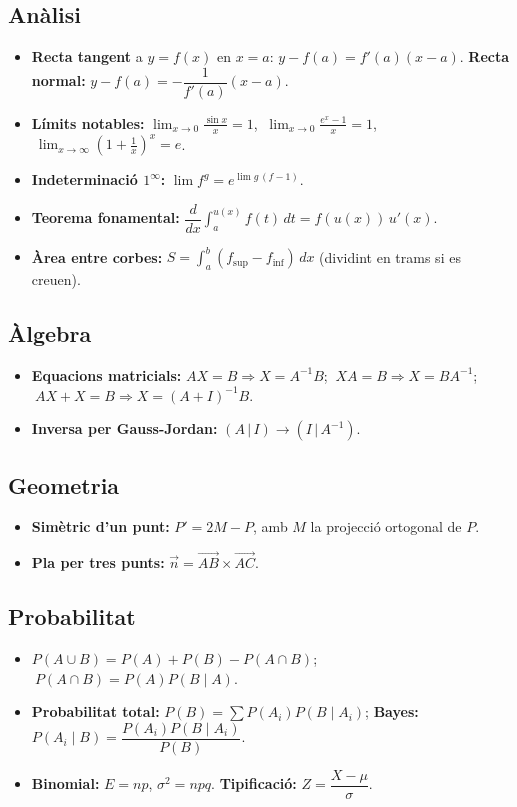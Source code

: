 \subsection*{Anàlisi}

\begin{itemize}
\item \textbf{Recta tangent} a $y=f(x)$ en $x=a$: $y-f(a)=f'(a)(x-a)$. \textbf{Recta normal:} $y-f(a)=-\dfrac{1}{f'(a)}(x-a)$.
\item \textbf{Límits notables:} $\displaystyle\lim_{x\to0}\frac{\sin x}{x}=1$, $\ \lim_{x\to0}\frac{e^x-1}{x}=1$, $\ \lim_{x\to\infty}\left(1+\frac1x\right)^x=e$.
\item \textbf{Indeterminació $1^\infty$:} $\displaystyle\lim f^g=e^{\lim g\,(f-1)}$.
\item \textbf{Teorema fonamental:} $\dfrac{d}{dx}\displaystyle\int_a^{u(x)}f(t)\,dt=f(u(x))\,u'(x)$.
\item \textbf{Àrea entre corbes:} $S=\displaystyle\int_a^b(f_{\text{sup}}-f_{\text{inf}})\,dx$ (dividint en trams si es creuen).
\end{itemize}

\subsection*{Àlgebra}

\begin{itemize}
\item \textbf{Equacions matricials:} $AX=B\Rightarrow X=A^{-1}B$; $\ XA=B\Rightarrow X=BA^{-1}$; $\ AX+X=B\Rightarrow X=(A+I)^{-1}B$.
\item \textbf{Inversa per Gauss-Jordan:} $(A\,|\,I)\to(I\,|\,A^{-1})$.
\end{itemize}

\subsection*{Geometria}

\begin{itemize}
\item \textbf{Simètric d'un punt:} $P'=2M-P$, amb $M$ la projecció ortogonal de $P$.
\item \textbf{Pla per tres punts:} $\vec n=\overrightarrow{AB}\times\overrightarrow{AC}$.
\end{itemize}

\subsection*{Probabilitat}

\begin{itemize}
\item $P(A\cup B)=P(A)+P(B)-P(A\cap B)$; $\ P(A\cap B)=P(A)P(B\mid A)$.
\item \textbf{Probabilitat total:} $P(B)=\sum P(A_i)P(B\mid A_i)$; \textbf{Bayes:} $P(A_i\mid B)=\dfrac{P(A_i)P(B\mid A_i)}{P(B)}$.
\item \textbf{Binomial:} $E=np$, $\sigma^2=npq$. \textbf{Tipificació:} $Z=\dfrac{X-\mu}{\sigma}$.
\end{itemize}

